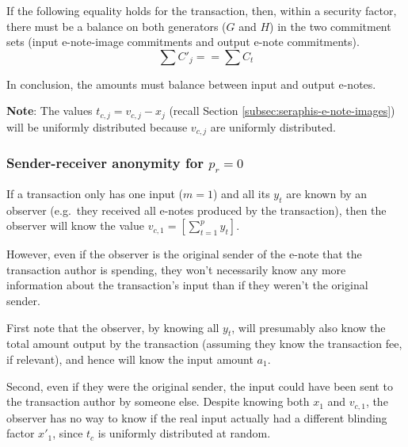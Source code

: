 If the following equality holds for the transaction, then, within a security factor, there must be a balance on both generators ($G$ and $H$) in the two commitment sets (input e-note-image commitments and output e-note commitments).\vspace{.115cm}
\[\sum C'_j == \sum C_t\]

In conclusion, the amounts must balance between input and output e-notes.

\textbf{Note}: The values $t_{c,j} = v_{c,j} - x_j$ (recall Section \ref{subsec:seraphis-e-note-images}) will be uniformly distributed because $v_{c,j}$ are uniformly distributed.

\subsubsection{Sender-receiver anonymity for $p_r = 0$}
\label{subsubsec:confidential-transactions-sender-receiver-anonymity}

If a transaction only has one input ($m = 1$) and all its $y_t$ are known by an observer (e.g.\ they received all e-notes produced by the transaction), then the observer will know the value $v_{c,1} = [\sum^{p}_{t=1} y_t]$.

However, even if the observer is the original sender of the e-note that the transaction author is spending, they won't necessarily know any more information about the transaction's input than if they weren't the original sender.

First note that the observer, by knowing all $y_t$, will presumably also know the total amount output by the transaction (assuming they know the transaction fee, if relevant), and hence will know the input amount $a_1$.

Second, even if they were the original sender, the input could have been sent to the transaction author by someone else. Despite knowing both $x_1$ and $v_{c,1}$, the observer has no way to know if the real input actually had a different blinding factor $x'_1$, since $t_c$ is uniformly distributed at random.

